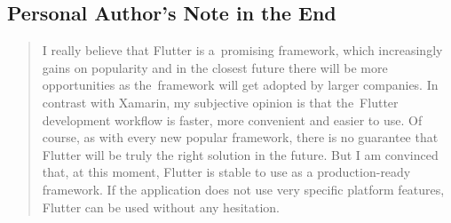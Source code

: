 \begin{conclusion}
\subsection{Personal Author's Note in the End}
\begin{quote}
I really believe that Flutter is a~promising framework, which increasingly gains on popularity and in the closest future there will be more opportunities as the~framework will get adopted by larger companies. In contrast with Xamarin, my subjective opinion is that the~Flutter development workflow is faster, more convenient and easier to use. Of course, as with every new popular framework, there is no guarantee that Flutter will be truly the right solution in the future. But I am convinced that, at this moment, Flutter is stable to use as a  production-ready framework. If the application does not use very specific platform features, Flutter can be used without any hesitation.
\end{quote}
\end{conclusion}